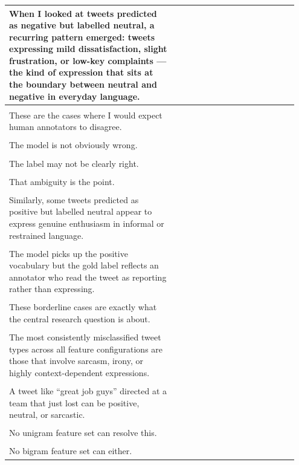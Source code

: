 \documentclass[11pt]{article}
\begin{document}
\begin{longtable}{|p{0.55\linewidth}|p{0.40\linewidth}|}
\hline
When I looked at tweets predicted as negative but labelled neutral, a recurring pattern emerged: tweets expressing mild dissatisfaction, slight frustration, or low-key complaints --- the kind of expression that sits at the boundary between neutral and negative in everyday language. & \\[2pt]
\hline
\rule{0pt}{3.5cm} & \\
\hline
These are the cases where I would expect human annotators to disagree. & \\[2pt]
\hline
\rule{0pt}{3.5cm} & \\
\hline
The model is not obviously wrong. & \\[2pt]
\hline
\rule{0pt}{3.5cm} & \\
\hline
The label may not be clearly right. & \\[2pt]
\hline
\rule{0pt}{3.5cm} & \\
\hline
That ambiguity is the point. & \\[2pt]
\hline
\rule{0pt}{3.5cm} & \\
\hline
Similarly, some tweets predicted as positive but labelled neutral appear to express genuine enthusiasm in informal or restrained language. & \\[2pt]
\hline
\rule{0pt}{3.5cm} & \\
\hline
The model picks up the positive vocabulary but the gold label reflects an annotator who read the tweet as reporting rather than expressing. & \\[2pt]
\hline
\rule{0pt}{3.5cm} & \\
\hline
These borderline cases are exactly what the central research question is about. & \\[2pt]
\hline
\rule{0pt}{3.5cm} & \\
\hline
The most consistently misclassified tweet types across all feature configurations are those that involve sarcasm, irony, or highly context-dependent expressions. & \\[2pt]
\hline
\rule{0pt}{3.5cm} & \\
\hline
A tweet like ``great job guys'' directed at a team that just lost can be positive, neutral, or sarcastic. & \\[2pt]
\hline
\rule{0pt}{3.5cm} & \\
\hline
No unigram feature set can resolve this. & \\[2pt]
\hline
\rule{0pt}{3.5cm} & \\
\hline
No bigram feature set can either. & \\[2pt]

\end{longtable}
\end{document}
